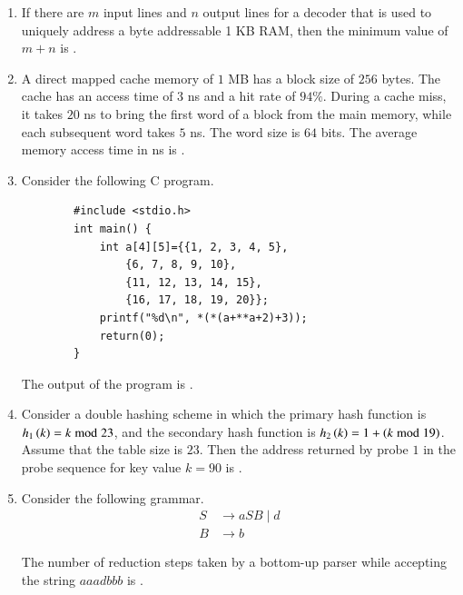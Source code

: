 \documentclass[journal,12pt,onecolumn]{IEEEtran}
\theoremstyle{remark}
\begin{document}
\begin{enumerate}
	\hfill{}
	
	\item If there are $m$ input lines and $n$ output lines for a decoder that is used to uniquely address a byte addressable 1 KB RAM, then the minimum value of $m+n$ is \underline{\hspace{2cm}}.
	
	\hfill{}
	\item A direct mapped cache memory of $1$ MB has a block size of $256$ bytes. The cache has an access time of $3$ ns and a hit rate of $94\%$. During a cache miss, it takes $20$ ns to bring the first word of a block from the main memory, while each subsequent word takes $5$ ns. The word size is $64$ bits. The average memory access time in ns  is \underline{\hspace{2cm}}.
	
	\hfill{}
	
	\item Consider the following C program.
	\begin{verbatim}
		#include <stdio.h>
		int main() {
			int a[4][5]={{1, 2, 3, 4, 5},
				{6, 7, 8, 9, 10},
				{11, 12, 13, 14, 15},
				{16, 17, 18, 19, 20}};
			printf("%d\n", *(*(a+**a+2)+3));
			return(0);
		}
	\end{verbatim}
	
	The output of the program is \underline{\hspace{2cm}}.
	
	\hfill{}
	
	\item Consider a double hashing scheme in which the primary hash function is $h_{1}\left(k\right) = k \bmod 23$, and the secondary hash function is $h_{2}\left(k\right) = 1 + \left(k \bmod 19\right)$. Assume that the table size is $23$. Then the address returned by probe $1$ in the probe sequence  for key value $k=90$ is \underline{\hspace{2cm}}.
	
	\hfill{}
	
	\item Consider the following grammar.
	\begin{align*}
		S &\to aSB \mid d \\
		B &\to b
	\end{align*}
	
	The number of reduction steps taken by a bottom-up parser while accepting the string $aaadbbb$ is \underline{\hspace{2cm}}.
	

\end{enumerate}
\end{document}
